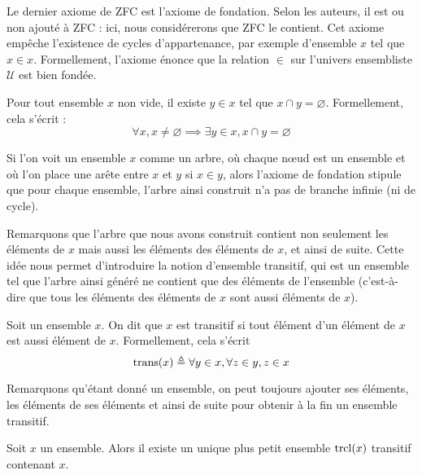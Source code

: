 Le dernier axiome de ZFC est l'axiome de fondation. Selon les auteurs, il est ou
non ajouté à ZFC : ici, nous considérerons que ZFC le contient. Cet axiome
empêche l'existence de cycles d'appartenance, par exemple d'ensemble $x$ tel que
$x\in x$. Formellement, l'axiome énonce que la relation $\in$ sur l'univers
ensembliste $\mathcal U$ est bien fondée.

\begin{axiom}[Fondation]\label{ax.ZF.AF}
  Pour tout ensemble $x$ non vide, il existe $y\in x$ tel que
  $x\cap y = \varnothing$. Formellement, cela s'écrit :
  \[\forall x, x\neq\varnothing \implies \exists y \in x, x\cap y =
  \varnothing\]
\end{axiom}

Si l'on voit un ensemble $x$ comme un arbre, où chaque n\oe ud est un ensemble
et où l'on place une arête entre $x$ et $y$ si $x\in y$, alors l'axiome de
fondation stipule que pour chaque ensemble, l'arbre ainsi construit n'a pas de
branche infinie (ni de cycle).

Remarquons que l'arbre que nous avons construit contient non seulement les
éléments de $x$ mais aussi les éléments des éléments de $x$, et ainsi de suite.
Cette idée nous permet d'introduire la notion d'ensemble transitif, qui est un
ensemble tel que l'arbre ainsi généré ne contient que des éléments de l'ensemble
(c'est-à-dire que tous les éléments des éléments de $x$ sont aussi éléments de
$x$).

\begin{definition}
  Soit un ensemble $x$. On dit que $x$ est transitif si tout élément d'un
  élément de $x$ est aussi élément de $x$. Formellement, cela s'écrit
  \[\operatorname{trans}(x) \triangleq \forall y\in x, \forall z \in y, z\in x\]
\end{definition}

Remarquons qu'étant donné un ensemble, on peut toujours ajouter ses éléments,
les éléments de ses éléments et ainsi de suite pour obtenir à la fin un ensemble
transitif.

\begin{proposition}
  Soit $x$ un ensemble. Alors il existe un unique plus petit ensemble $\operatorname{trcl}(x)$
  transitif contenant $x$.
\end{proposition}


